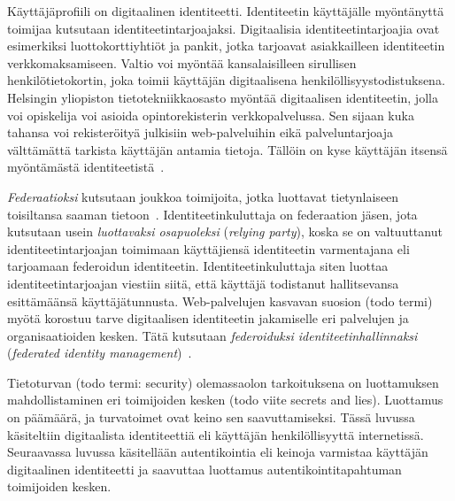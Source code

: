 \documentclass[finnish,gradu]{tktltiki}
\begin{document}
  Käyttäjäprofiili on digitaalinen identiteetti. Identiteetin käyttäjälle myöntänyttä toimijaa kutsutaan identiteetintarjoajaksi. Digitaalisia identiteetintarjoajia ovat esimerkiksi luottokorttiyhtiöt ja pankit, jotka tarjoavat asiakkailleen identiteetin verkkomaksamiseen. Valtio voi myöntää kansalaisilleen sirullisen henkilötietokortin, joka toimii käyttäjän digitaalisena henkilöllisyystodistuksena. Helsingin yliopiston tietotekniikkaosasto myöntää digitaalisen identiteetin, jolla voi opiskelija voi asioida opintorekisterin verkkopalvelussa. Sen sijaan kuka tahansa voi rekisteröityä julkisiin web-palveluihin eikä palveluntarjoaja välttämättä tarkista käyttäjän antamia tietoja. Tällöin on kyse käyttäjän itsensä myöntämästä identiteetistä~\cite{cameron_id_arch_2006}.

  \emph{Federaatioksi} kutsutaan joukkoa toimijoita, jotka luottavat tietynlaiseen toisiltansa saaman tietoon~\cite{id_in_federation_systems_2005, federated_auth_case_2008}. Identiteetinkuluttaja on federaation jäsen, jota kutsutaan usein \emph{luottavaksi osapuoleksi} (\emph{relying party}), koska se on valtuuttanut identiteetintarjoajan toimimaan käyttäjiensä identiteetin varmentajana eli tarjoamaan federoidun identiteetin. Identiteetinkuluttaja siten luottaa identiteetintarjoajan viestiin siitä, että käyttäjä todistanut hallitsevansa esittämäänsä käyttäjätunnusta. Web-palvelujen kasvavan suosion (todo termi) myötä korostuu tarve digitaalisen identiteetin jakamiselle eri palvelujen ja organisaatioiden kesken. Tätä kutsutaan \emph{federoiduksi identiteetinhallinnaksi} (\emph{federated identity management})~\cite{id_in_federation_systems_2005}.

  Tietoturvan (todo termi: security) olemassaolon tarkoituksena on luottamuksen mahdollistaminen eri toimijoiden kesken (todo viite secrets and lies). Luottamus on päämäärä, ja turvatoimet ovat keino sen saavuttamiseksi. Tässä luvussa käsiteltiin digitaalista identiteettiä eli käyttäjän henkilöllisyyttä internetissä. Seuraavassa luvussa käsitellään autentikointia eli keinoja varmistaa käyttäjän digitaalinen identiteetti ja saavuttaa luottamus autentikointitapahtuman toimijoiden kesken.


\end{document}
